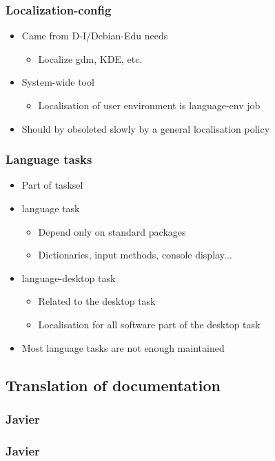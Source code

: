 \documentclass{beamer}
\begin{document}
\begin{frame}
  \frametitle{Localization-config}
	\begin{itemize}
	\item
		Came from D-I/Debian-Edu needs
		\begin{itemize}
		\item
			Localize gdm, KDE, etc.
		\end{itemize}
	\item
		System-wide tool
		\begin{itemize}
		\item
			Localisation of user environment is language-env job
		\end{itemize}
	\item
		Should by obsoleted slowly by a general localisation policy
	\end{itemize}
\end{frame}

\begin{frame}
  \frametitle{Language tasks}
	\begin{itemize}
	\item
		Part of tasksel
	\item
		language task
		\begin{itemize}
		\item
			Depend only on standard packages
		\item
			Dictionaries, input methods, console display...
		\end{itemize}
	\item
		language-desktop task
		\begin{itemize}
		\item
			Related to the desktop task
		\item
			Localisation for all software part of the desktop task
		\end{itemize}
	\item
		Most language tasks are not enough maintained
	\end{itemize}
\end{frame}

\subsection{Translation of documentation}

\begin{frame}
  \frametitle{Javier}
\end{frame}

\begin{frame}
  \frametitle{Javier}
\end{frame}
\end{document}
